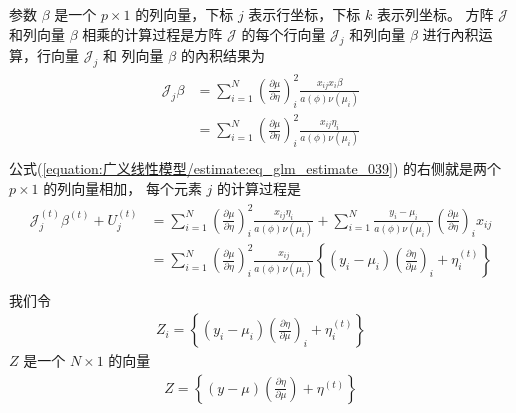 \documentclass[letterpaper,10pt,english]{sphinxmanual}
\begin{document}
参数 \(\beta\) 是一个 \(p \times 1\)
的列向量，下标 \(j\) 表示行坐标，下标 \(k\) 表示列坐标。
方阵 \(\mathcal{J}\) 和列向量 \(\beta\)
相乘的计算过程是方阵 \(\mathcal{J}\) 的每个行向量
\(\mathcal{J}_j\) 和列向量 \(\beta\)
进行內积运算，行向量 \(\mathcal{J}_j\) 和
列向量 \(\beta\) 的內积结果为
\begin{align}\label{equation:广义线性模型/estimate:广义线性模型/estimate:36}\!\begin{aligned}
\mathcal{J}_{j} \beta
&=
\sum_{i=1}^N
\left ( \frac{\partial \mu}{\partial \eta} \right )^2_i  \frac{  x_{ij} x_{i}\beta}{ a(\phi) \nu(\mu_i) }\\
&=    \sum_{i=1}^N
\left ( \frac{\partial \mu}{\partial \eta} \right )^2_i  \frac{  x_{ij} \eta_i}{ a(\phi) \nu(\mu_i) }\\
\end{aligned}\end{align}
公式(\ref{equation:广义线性模型/estimate:eq_glm_estimate_039}) 的右侧就是两个 \(p\times 1\) 的列向量相加，
每个元素 \(j\) 的计算过程是
\begin{align}\label{equation:广义线性模型/estimate:广义线性模型/estimate:37}\!\begin{aligned}
\mathcal{J}^{(t)}_j \beta^{(t)} +  U^{(t)}_j
&=  \sum_{i=1}^N
\left ( \frac{\partial \mu}{\partial \eta} \right )^2_i  \frac{  x_{ij} \eta_i}{ a(\phi) \nu(\mu_i) }
+
\sum_{i=1}^N \frac{y_i-\mu_i}{a(\phi) \nu(\mu_i) } \left ( \frac{\partial \mu}{\partial \eta} \right )_i x_{ij}\\
&=
\sum_{i=1}^N \left ( \frac{\partial \mu}{\partial \eta} \right )^2_i \frac{ x_{ij}}{ a(\phi) \nu(\mu_i) }
\left \{
(y_i-\mu_i)\left ( \frac{\partial \eta}{\partial \mu} \right)_i + \eta_i^{(t)}
\right \}\\
\end{aligned}\end{align}
我们令
\begin{equation}\label{equation:广义线性模型/estimate:广义线性模型/estimate:38}
\begin{split}Z_i = \left \{
(y_i-\mu_i)\left ( \frac{\partial \eta}{\partial \mu} \right)_i + \eta_i^{(t)}
\right \}\end{split}
\end{equation}
\(Z\) 是一个 \(N \times 1\) 的向量
\begin{equation}\label{equation:广义线性模型/estimate:广义线性模型/estimate:39}
\begin{split}Z = \left \{
(y-\mu)\left ( \frac{\partial \eta}{\partial \mu} \right) + \eta^{(t)}
\right \}\end{split}
\end{equation}
\end{document}
